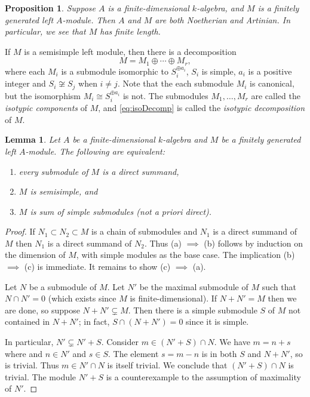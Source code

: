 \documentclass[12pt]{article}
\theoremstyle{plain}
\newtheorem{lemma}[theorem]{Lemma}
\newtheorem{proposition}[theorem]{Proposition}
\theoremstyle{definition}
\theoremstyle{remark}
\numberwithin{equation}{section}
\begin{document}
\begin{proposition}
Suppose $A$ is a finite-dimensional $k$-algebra,
and $M$ is a finitely generated left $A$-module.
Then $A$ and $M$ are both Noetherian and Artinian.
In particular, we see that $M$ has finite length.
\end{proposition}

If $M$ is a semisimple left module, then there is a decomposition
\begin{equation} \label{eq:isoDecomp}
M = M_1 \oplus \cdots \oplus M_r,
\end{equation}
where each $M_i$ is a submodule isomorphic to $S_i^{\oplus a_i}$,
$S_i$ is simple, $a_i$ is a positive integer
and $S_i \not\cong S_j$ when $i \ne j$.
Note that the each submodule $M_i$ is canonical, but the
isomorphism $M_i \cong S_i^{\oplus a_i}$ is not.
The submodules $M_1, \ldots, M_r$ are called the \emph{isotypic
components} of $M$, and \eqref{eq:isoDecomp} is called the \emph{isotypic
decomposition} of $M$.

\begin{lemma} \label{lem:ssModule}
Let $A$ be a finite-dimensional $k$-algebra and $M$ be a finitely
generated left $A$-module.
The following are equivalent:
\begin{enumerate}
\item[(a)] every submodule of $M$ is a direct summand,
\item[(b)] $M$ is semisimple, and
\item[(c)] $M$ is sum of simple submodules (not a priori direct).
\end{enumerate}
\end{lemma}

\begin{proof}
If $N_1 \subset N_2 \subset M$ is a chain of submodules and $N_1$ is a
direct summand of $M$ then $N_1$ is a direct summand of $N_2$.
Thus (a) $\implies$ (b) follows by induction on the dimension of $M$,
with simple modules as the base case.  The implication (b) $\implies$
(c) is immediate.  It remains to show (c) $\implies$ (a).

Let $N$ be a submodule of $M$.
Let $N'$ be the maximal submodule of $M$ such that $N \cap N' = 0$
(which exists since $M$ is finite-dimensional).
If $N + N' = M$ then we are done, so suppose $N + N' \subsetneq M$.
Then there is a simple submodule $S$ of $M$ not contained in $N+N'$;
in fact, $S \cap (N+N')=0$ since it is simple.

In particular, $N' \subsetneq N'+S$.
Consider $m \in (N'+S) \cap N$.  We have $m=n+s$ where and $n \in N'$
and $s \in S$.  The element $s=m-n$ is in both $S$ and $N+N'$, so is
trivial.  Thus $m \in N' \cap N$ is itself trivial.
We conclude that $(N'+S) \cap N$ is trivial.
The module $N'+S$ is a counterexample to the assumption of maximality of
$N'$.
\end{proof}
\end{document}
